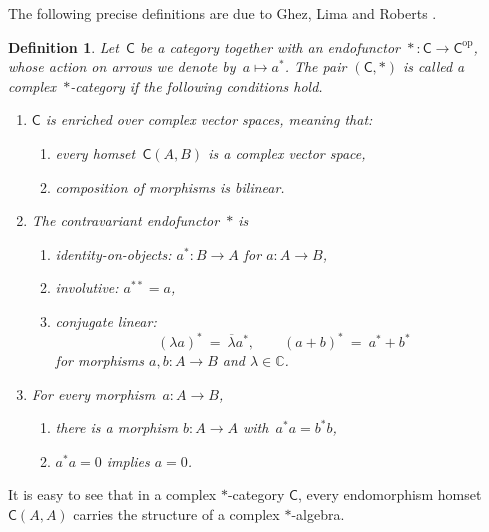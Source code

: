 \documentclass[reqno,T1,11pt]{amsproc}
\newcommand{\C}{\mathbb{C}}
\newcommand{\op}{\mathrm{op}}
\newcommand{\cat}[1]{\mathsf{#1}}		%
\theoremstyle{plain}
\newtheorem{defn}[thm]{Definition}
\theoremstyle{remark}
\numberwithin{equation}{section}
\begin{document}
    The following precise definitions are due to Ghez, Lima and Roberts \cite{wstarcat}.

\begin{defn}
    Let~$\cat{C}$ be a category together with an endofunctor~$*\,\colon \cat{C} \to \cat{C}^\op$,
    whose action on arrows we denote by~$a\mapsto a^*$. The pair $(\cat{C},*)$ is called a \emph{complex~$*$-category} if the following conditions hold.
\begin{enumerate}
    \item $\cat{C}$ is enriched over complex vector spaces, meaning that:
	    \begin{enumerate}
		    \item every homset~$\cat{C}(A,B)$ is a complex vector space,
		    \item composition of morphisms is bilinear.
	   \end{enumerate}
    \item The contravariant endofunctor~$*$ is
	    \begin{enumerate}
		    \item identity-on-objects: $a^* : B \to A$ for $a : A \to B$,
		    \item involutive: $a^{**} = a$,
		    \item conjugate linear:
			    \[
				    (\lambda a)^* \ =\  \overline{\lambda} a^*,\qquad (a+b)^* \ =\  a^* + b^*
			    \]
			    for morphisms $a, b : A \to B$ and $\lambda\in\C$.
	    \end{enumerate}
    \item For every morphism~$a : A \to B$,
	    \begin{enumerate}
		    \item there is a morphism $b :  A \to A$ with~$a^*a=b^*b$,
		    \item $a^*a=0$ implies $a = 0$.
	    \end{enumerate}
\end{enumerate}
\end{defn}

It is easy to see that in a complex $*$-category $\cat{C}$, every endomorphism homset $\cat{C}(A,A)$ carries the structure of a complex $*$-algebra. 
\end{document}
